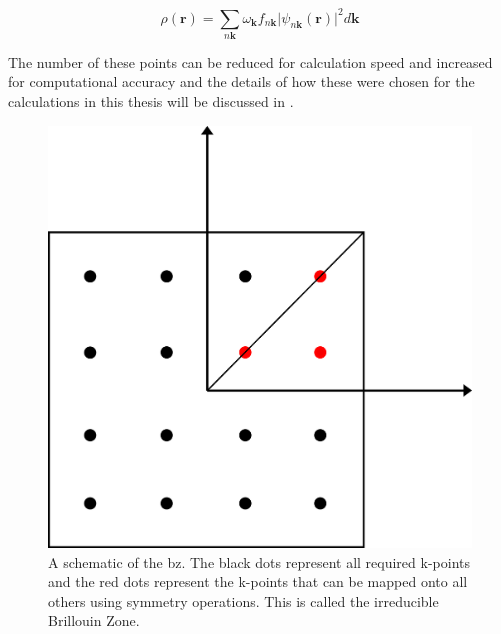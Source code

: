 \begin{equation}
\rho(\mathbf{r}) = \sum_{n\mathbf{k}} \omega_\mathbf{k} f_{n\mathbf{k}} \lvert \psi_{n\mathbf{k}}(\mathbf{r}) \rvert^2 d\mathbf{k}
\end{equation}

The number of these points can be reduced for calculation speed and increased for computational accuracy and the details of how these were chosen for the calculations in this thesis will be discussed in . 

\begin{figure}
    \centering
    \includegraphics{Figures/Misc/Theory/BZ+IBZ.png}
    \captionsetup{font = footnotesize, justification = centering}
    \caption[A Schematic of the Brillouin Zone]{A schematic of the \acrshort{bz}. The black dots represent all required k-points and the red dots represent the k-points that can be mapped onto all others using symmetry operations. This is called the irreducible Brillouin Zone.}
    \label{fig:BZIBZ}
\end{figure}

